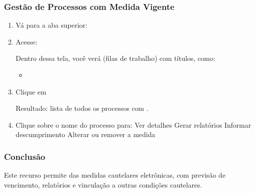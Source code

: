 \documentclass[letterpaper,10pt,brazil]{sphinxmanual}
\begin{document}
\subsubsection{Gestão de Processos com Medida Vigente}
\label{\detokenize{projud_56_cadastromedidacautelar:gestao-de-processos-com-medida-vigente}}\begin{enumerate}
%
\item {} 
\sphinxAtStartPar
Vá para a aba superior: 

\item {} 
\sphinxAtStartPar
Acesse: 

\sphinxAtStartPar
Dentro dessa tela, você verá  (filas de trabalho) com títulos, como:
\begin{itemize}
\item {} 
\sphinxAtStartPar
{}
\sphinxhyphen{} 
\sphinxhyphen{} 
\sphinxhyphen{} 

\end{itemize}

\item {} 
\sphinxAtStartPar
Clique em 

\sphinxAtStartPar
Resultado: lista de todos os processos com .

\item {} 
\sphinxAtStartPar
Clique sobre o nome do processo para:
\sphinxhyphen{} Ver detalhes
\sphinxhyphen{} Gerar relatórios
\sphinxhyphen{} Informar descumprimento
\sphinxhyphen{} Alterar ou remover a medida

\end{enumerate}


\subsubsection{Conclusão}
\label{\detokenize{projud_56_cadastromedidacautelar:conclusao}}
\sphinxAtStartPar
Este recurso permite  das medidas cautelares eletrônicas, com previsão de vencimento, relatórios e vinculação a outras condições cautelares.

\sphinxstepscope
\end{document}
